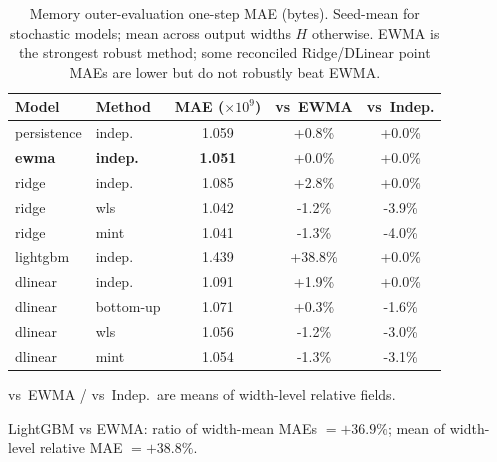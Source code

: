 \begin{table}[width=\columnwidth,pos=t]
\centering
\caption{Memory outer-evaluation one-step MAE (bytes). Seed-mean for stochastic models; mean across output widths $H$ otherwise. EWMA is the strongest robust method; some reconciled Ridge/DLinear point MAEs are lower but do not robustly beat EWMA.}
\label{tab:memory_main}
\begin{threeparttable}
\small
\setlength{\tabcolsep}{3pt}
\begin{tabular*}{\tblwidth}{@{\extracolsep{\fill}}llccc@{}}
\toprule
Model & Method & MAE ($\times 10^9$) & vs~EWMA & vs~Indep. \\
\midrule
persistence & indep. & 1.059 & +0.8\% & +0.0\% \\
\textbf{ewma} & \textbf{indep.} & \textbf{1.051} & +0.0\% & +0.0\% \\
ridge & indep. & 1.085 & +2.8\% & +0.0\% \\
ridge & wls & 1.042 & -1.2\% & -3.9\% \\
ridge & mint & 1.041 & -1.3\% & -4.0\% \\
lightgbm & indep. & 1.439 & +38.8\% & +0.0\% \\
dlinear & indep. & 1.091 & +1.9\% & +0.0\% \\
dlinear & bottom-up & 1.071 & +0.3\% & -1.6\% \\
dlinear & wls & 1.056 & -1.2\% & -3.0\% \\
dlinear & mint & 1.054 & -1.3\% & -3.1\% \\
\bottomrule
\end{tabular*}
\begin{tablenotes}
\footnotesize
\item vs~EWMA / vs~Indep.\ are means of width-level relative fields.
\item LightGBM vs EWMA: ratio of width-mean MAEs $=+36.9\%$; mean of width-level relative MAE $=+38.8\%$.
\end{tablenotes}
\end{threeparttable}
\end{table}
